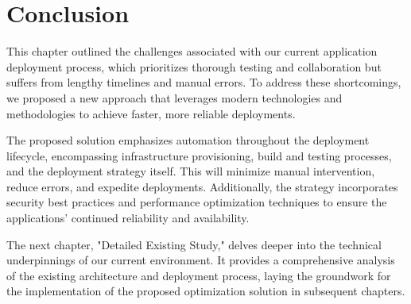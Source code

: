 \section*{Conclusion}
This chapter outlined the challenges associated with our current application deployment process, which prioritizes thorough testing and collaboration but suffers from lengthy timelines and manual errors. To address these shortcomings, we proposed a new approach that leverages modern technologies and methodologies to achieve faster, more reliable deployments.
\par
The proposed solution emphasizes automation throughout the deployment lifecycle, encompassing infrastructure provisioning, build and testing processes, and the deployment strategy itself. This will minimize manual intervention, reduce errors, and expedite deployments. Additionally, the strategy incorporates security best practices and performance optimization techniques to ensure the applications' continued reliability and availability.
\par
The next chapter, "Detailed Existing Study," delves deeper into the technical underpinnings of our current environment. It provides a comprehensive analysis of the existing architecture and deployment process, laying the groundwork for the implementation of the proposed optimization solution in subsequent chapters.